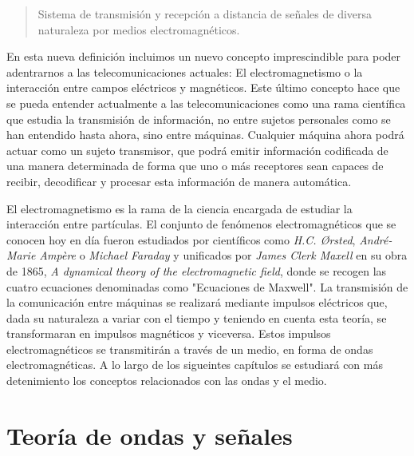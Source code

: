 \begin{quote}

\small Sistema de transmisión y recepción a distancia de señales de diversa naturaleza por medios electromagnéticos.

\end{quote}

\par En esta nueva definición incluimos un nuevo concepto imprescindible para poder adentrarnos a las telecomunicaciones actuales: El electromagnetismo o la interacción entre campos eléctricos y magnéticos. Este último concepto hace que se pueda entender actualmente a las telecomunicaciones como una rama científica que estudia la transmisión de información, no entre sujetos personales como se han entendido hasta ahora, sino entre máquinas. Cualquier máquina  ahora podrá actuar como un sujeto transmisor, que podrá emitir información codificada de una manera determinada de forma que uno o más receptores sean capaces de recibir, decodificar y procesar esta información de manera automática.
\\
\par El electromagnetismo es la rama de la ciencia encargada de estudiar la interacción entre partículas. El conjunto de fenómenos electromagnéticos que se conocen hoy en día fueron estudiados por científicos como \textit{H.C. Ørsted}, \textit{André-Marie Ampère} o \textit{Michael Faraday} y unificados por \textit{James Clerk Maxell} en su obra de 1865, \textit{A dynamical theory of the electromagnetic field}, donde se recogen las cuatro ecuaciones denominadas como "Ecuaciones de Maxwell". La transmisión de la comunicación entre máquinas se realizará mediante impulsos eléctricos que, dada su naturaleza a variar con el tiempo y teniendo en cuenta esta teoría, se transformaran en impulsos magnéticos y viceversa. Estos impulsos electromagnéticos se transmitirán a través de un medio, en forma de ondas electromagnéticas. A lo largo de los sigueintes capítulos se estudiará con más detenimiento los conceptos relacionados con las ondas y el medio.

\section{Teoría de ondas y señales}

